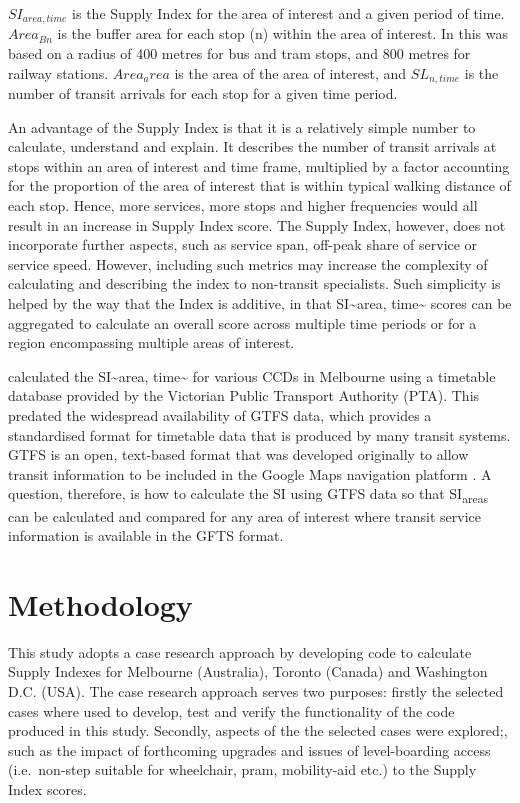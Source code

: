 \documentclass[numbered]{trbunofficial}
\begin{document}
\(SI_{area, time}\) is the Supply Index for the area of interest and a
given period of time. \(Area_{Bn}\) is the buffer area for each stop (n)
within the area of interest. In \citet{currie2007identifying} this was
based on a radius of 400 metres for bus and tram stops, and 800 metres
for railway stations. \(Area_area\) is the area of the area of interest,
and \(SL_{n,time}\) is the number of transit arrivals for each stop for
a given time period.

An advantage of the Supply Index is that it is a relatively simple
number to calculate, understand and explain. It describes the number of
transit arrivals at stops within an area of interest and time frame,
multiplied by a factor accounting for the proportion of the area of
interest that is within typical walking distance of each stop. Hence,
more services, more stops and higher frequencies would all result in an
increase in Supply Index score. The Supply Index, however, does not
incorporate further aspects, such as service span, off-peak share of
service or service speed. However, including such metrics may increase
the complexity of calculating and describing the index to non-transit
specialists. Such simplicity is helped by the way that the Index is
additive, in that SI\textasciitilde area, time\textasciitilde{} scores
can be aggregated to calculate an overall score across multiple time
periods or for a region encompassing multiple areas of interest.

\citet{currie2007identifying} calculated the SI\textasciitilde area,
time\textasciitilde{} for various CCDs in Melbourne using a timetable
database provided by the Victorian Public Transport Authority (PTA).
This predated the widespread availability of GTFS data, which provides a
standardised format for timetable data that is produced by many transit
systems. GTFS is an open, text-based format that was developed
originally to allow transit information to be included in the Google
Maps navigation platform \citep{GTFS}. A question, therefore, is how to
calculate the SI using GTFS data so that SI\textsubscript{areas} can be
calculated and compared for any area of interest where transit service
information is available in the GFTS format.

\hypertarget{methodology}{%
\section{Methodology}\label{methodology}}

This study adopts a case research approach by developing code to
calculate Supply Indexes for Melbourne (Australia), Toronto (Canada) and
Washington D.C. (USA). The case research approach serves two purposes:
firstly the selected cases where used to develop, test and verify the
functionality of the code produced in this study. Secondly, aspects of
the the selected cases were explored;, such as the impact of forthcoming
upgrades and issues of level-boarding access (i.e.~non-step suitable for
wheelchair, pram, mobility-aid etc.) to the Supply Index scores.
\end{document}
